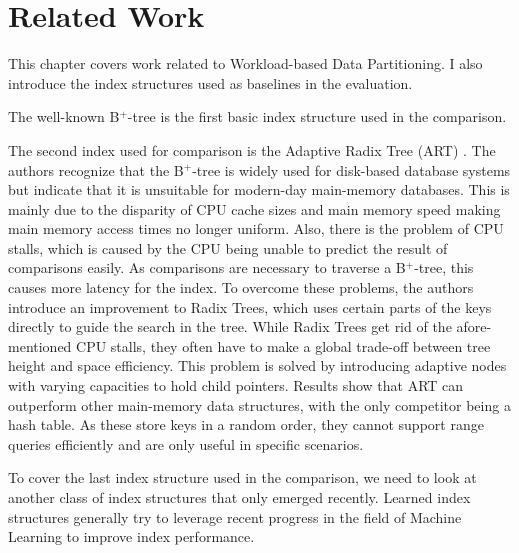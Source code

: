 \thispagestyle{plain}
\chapter{Related Work}\label{sec:related_work}

This chapter covers work related to Workload-based Data Partitioning. I also introduce the index structures used as baselines in the evaluation.

The well-known B$^+$-tree \cite{Bayer1970-rh} is the first basic index structure used in the comparison.

The second index used for comparison is the Adaptive Radix Tree (ART) \cite{Leis2013}. The authors recognize that the B$^+$-tree is widely used for disk-based database systems but indicate that it is unsuitable for modern-day main-memory databases. This is mainly due to the disparity of CPU cache sizes and main memory speed making main memory access times no longer uniform. Also, there is the problem of CPU stalls, which is caused by the CPU being unable to predict the result of comparisons easily. As comparisons are necessary to  traverse a B$^+$-tree, this causes more latency for the index. To overcome these problems, the authors introduce an improvement to Radix Trees, which uses certain parts of the keys directly to guide the search in the tree. While Radix Trees get rid of the afore-mentioned CPU stalls, they often have to make a global trade-off between tree height and space efficiency. This problem is solved by introducing adaptive nodes with varying capacities to hold child pointers. Results show that ART can outperform other main-memory data structures, with the only competitor being a hash table. As these store keys in a random order, they cannot support range queries efficiently and are only useful in specific scenarios.

To cover the last index structure used in the comparison, we need to look at another class of index structures that only emerged recently. Learned index structures generally try to leverage recent progress in the field of Machine Learning to improve index performance.

